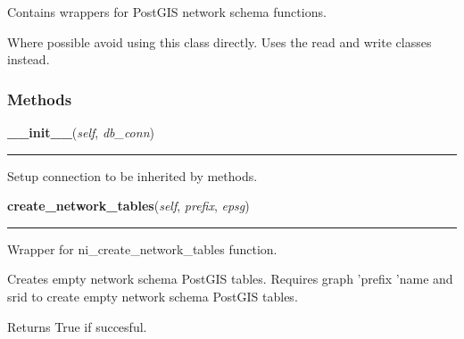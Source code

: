     \label{nx_pgnet:nisql}
Contains wrappers for PostGIS network schema functions.

Where possible avoid using this class directly. Uses the read and write 
classes instead.



  \subsubsection{Methods}

    \label{nx_pgnet:nisql:__init__}

    \vspace{0.5ex}

\hspace{.8\funcindent}\begin{boxedminipage}{\funcwidth}

    \raggedright \textbf{\_\_init\_\_}(\textit{self}, \textit{db\_conn})

    \vspace{-1.5ex}

    \rule{\textwidth}{0.5\fboxrule}
\setlength{\parskip}{2ex}
    Setup connection to be inherited by methods.

\setlength{\parskip}{1ex}
    \end{boxedminipage}

    \label{nx_pgnet:nisql:create_network_tables}

    \vspace{0.5ex}

\hspace{.8\funcindent}\begin{boxedminipage}{\funcwidth}

    \raggedright \textbf{create\_network\_tables}(\textit{self}, \textit{prefix}, \textit{epsg})

    \vspace{-1.5ex}

    \rule{\textwidth}{0.5\fboxrule}
\setlength{\parskip}{2ex}
    Wrapper for ni\_create\_network\_tables function.

    Creates empty network schema PostGIS tables. Requires graph 'prefix 
    'name and srid to create empty network schema PostGIS tables.

    Returns True if succesful.

\setlength{\parskip}{1ex}
    \end{boxedminipage}

